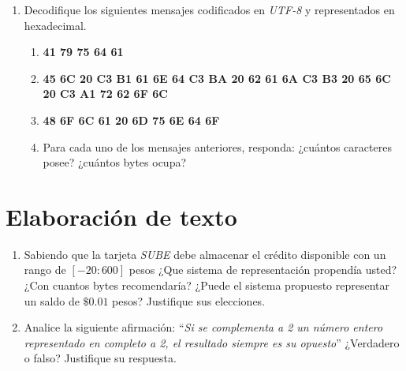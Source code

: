 \documentclass[12pt]{article}
\begin{document}
\begin{enumerate}

    \item Decodifique los siguientes mensajes codificados en \emph{UTF-8} y
        representados en hexadecimal.

        \begin{enumerate}

            \item \textbf{41 79 75 64 61}

            \item \textbf{45 6C 20 C3 B1 61 6E 64 C3 BA 20 62 61 6A C3 B3 20
                65 6C 20 C3 A1 72 62 6F 6C}

            \item \textbf{48 6F 6C 61 20 6D 75 6E 64 6F}

            \item Para cada uno de los mensajes anteriores, responda: ¿cuántos
                caracteres posee? ¿cuántos bytes ocupa?

        \end{enumerate}

\end{enumerate}

\section{Elaboración de texto}

\begin{enumerate}

    \item Sabiendo que la tarjeta \textit{SUBE} debe almacenar el crédito
        disponible con un rango de $[-20:600]$ pesos ¿Que sistema de
        representación propendía usted? ¿Con cuantos bytes recomendaría?
        ¿Puede el sistema propuesto representar un saldo de $\$0.01$ pesos?
        Justifique sus elecciones.

    \item Analice la siguiente afirmación: ``\emph{Si se complementa a 2 un
        número entero representado en completo a 2, el resultado siempre es su
        opuesto}'' ¿Verdadero o falso? Justifique su respuesta.

\end{enumerate}
\end{document}
